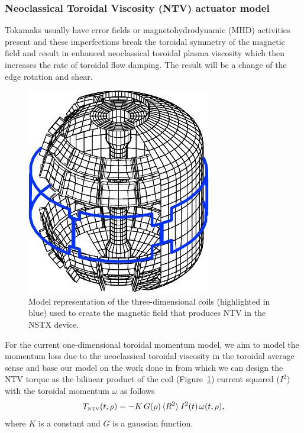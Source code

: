 \documentclass[12pt]{iopart}
\begin{document}
\subsubsection{Neoclassical Toroidal Viscosity (NTV) actuator model}
 \label{TNTV}

Tokamaks usually have error fields or magnetohydrodynamic (MHD) activities present and these imperfections break the toroidal symmetry of the magnetic field and result in enhanced neoclassical toroidal plasma viscosity which then increases the rate of toroidal flow damping. The result will be a change of the edge rotation and shear. 

\begin{figure}
	\centering
   \includegraphics{imene_figs/pic_NTV}
\caption{Model representation of the three-dimensional coils (highlighted in blue) used to create the magnetic field that produces NTV in the NSTX device.}
  \label{pic_NTV}
\end{figure}
For the current one-dimensional toroidal momentum model, we aim to model the momentum loss due to the neoclassical toroidal viscosity in the toroidal average sense and base our model on the work done in \cite{Zhu06} from which we can design the NTV torque as the bilinear product of the coil (Figure~\ref{pic_NTV}) current squared ($ I^2$) with the toroidal momentum $\omega$ as follows
\begin{equation}
   T_\textrm{\tiny NTV}  (t, \rho) =  - K \, G(\rho) \,  \langle R^2 \rangle \:  I^2(t) \,\omega (t, \rho),
    \label{eqn:ntv}
\end{equation}
where $K$ is a constant and $G$ is a gaussian function.
\end{document}

